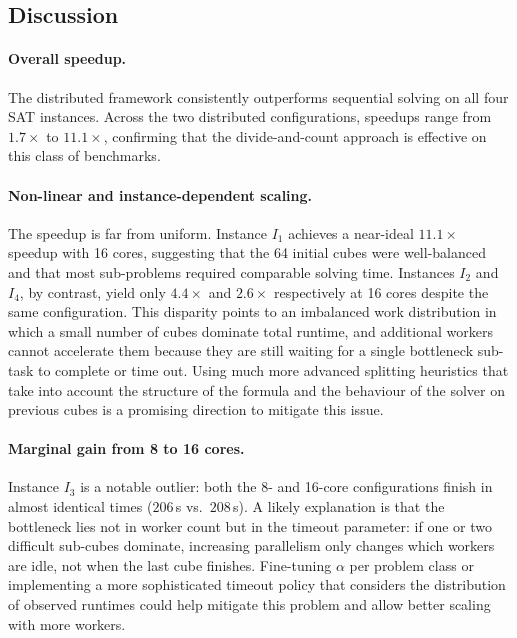 \documentclass{report}
\begin{document}
\subsection{Discussion}

\paragraph{Overall speedup.}
The distributed framework consistently outperforms sequential solving on all
four SAT instances.
Across the two distributed configurations, speedups range from
$1.7\times$ to $11.1\times$, confirming that the divide-and-count approach
is effective on this class of benchmarks.

\paragraph{Non-linear and instance-dependent scaling.}
The speedup is far from uniform.
Instance $I_1$ achieves a near-ideal $11.1\times$ speedup with 16 cores,
suggesting that the 64 initial cubes were well-balanced and that most
sub-problems required comparable solving time.
Instances $I_2$ and $I_4$, by contrast, yield only $4.4\times$ and $2.6\times$
respectively at 16 cores despite the same configuration.
This disparity points to an imbalanced work distribution in which a small number
of cubes dominate total runtime, and additional workers cannot accelerate them
because they are still waiting for a single bottleneck sub-task to complete or
time out. Using much more advanced splitting heuristics that take into account the structure of the formula and
the behaviour of the solver on previous cubes is a promising direction to mitigate this issue.

\paragraph{Marginal gain from 8 to 16 cores.}
Instance $I_3$ is a notable outlier: both the 8- and 16-core configurations
finish in almost identical times ($206$\,s vs.\ $208$\,s).
A likely explanation is that the bottleneck lies not in worker count but in the
timeout parameter: if one or two difficult sub-cubes dominate, increasing
parallelism only changes which workers are idle, not when the last cube finishes.
Fine-tuning $\alpha$ per problem class or implementing a more sophisticated 
timeout policy that considers the distribution of observed runtimes 
could help mitigate this problem and allow better scaling with more workers.
\end{document}
